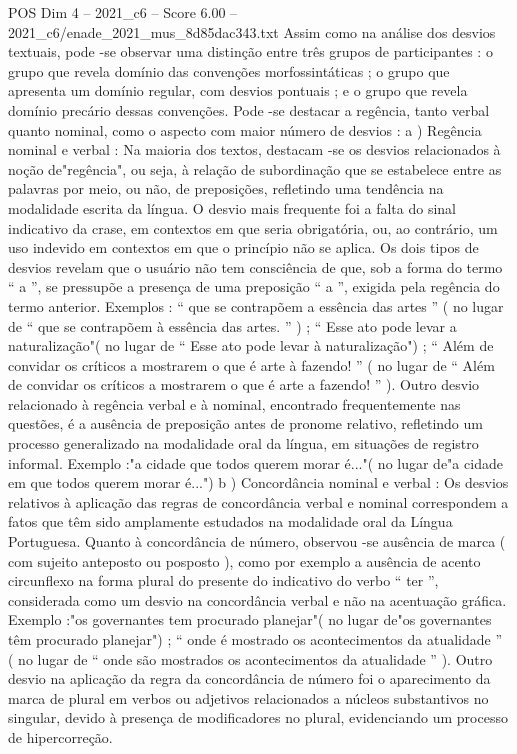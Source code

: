 \begin{textsample}{POS Dim 4 – 2021\_c6 – Score 6.00 – 2021\_c6/enade\_2021\_mus\_8d85dac343.txt}
Assim como na análise dos desvios textuais, pode -se observar uma distinção entre três grupos de participantes : o grupo que revela domínio das convenções morfossintáticas ; o grupo que apresenta um domínio regular, com desvios pontuais ; e o grupo que revela domínio precário dessas convenções.
Pode -se destacar a regência, tanto verbal quanto nominal, como o aspecto com maior número de desvios : a ) Regência nominal e verbal : Na maioria dos textos, destacam -se os desvios relacionados à noção de"regência", ou seja, à relação de subordinação que se estabelece entre as palavras por meio, ou não, de preposições, refletindo uma tendência na modalidade escrita da língua.
O desvio mais frequente foi a falta do sinal indicativo da crase, em contextos em que seria obrigatória, ou, ao contrário, um uso indevido em contextos em que o princípio não se aplica.
Os dois tipos de desvios revelam que o usuário não tem consciência de que, sob a forma do termo “ a ”, se pressupõe a presença de uma preposição “ a ”, exigida pela regência do termo anterior.
Exemplos : “ que se contrapõem a essência das artes ” ( no lugar de “ que se contrapõem à essência das artes. ” ) ; “ Esse ato pode levar a naturalização"( no lugar de “ Esse ato pode levar à naturalização") ; “ Além de convidar os críticos a mostrarem o que é arte à fazendo! ” ( no lugar de “ Além de convidar os críticos a mostrarem o que é arte a fazendo! ” ).
Outro desvio relacionado à regência verbal e à nominal, encontrado frequentemente nas questões, é a ausência de preposição antes de pronome relativo, refletindo um processo generalizado na modalidade oral da língua, em situações de registro informal.
Exemplo :"a cidade que todos querem morar é..."( no lugar de"a cidade em que todos querem morar é...") b ) Concordância nominal e verbal : Os desvios relativos à aplicação das regras de concordância verbal e nominal correspondem a fatos que têm sido amplamente estudados na modalidade oral da Língua Portuguesa.
Quanto à concordância de número, observou -se ausência de marca ( com sujeito anteposto ou posposto ), como por exemplo a ausência de acento circunflexo na forma plural do presente do indicativo do verbo “ ter ”, considerada como um desvio na concordância verbal e não na acentuação gráfica.
Exemplo :"os governantes tem procurado planejar"( no lugar de"os governantes têm procurado planejar") ; “ onde é mostrado os acontecimentos da atualidade ” ( no lugar de “ onde são mostrados os acontecimentos da atualidade ” ).
Outro desvio na aplicação da regra da concordância de número foi o aparecimento da marca de plural em verbos ou adjetivos relacionados a núcleos substantivos no singular, devido à presença de modificadores no plural, evidenciando um processo de hipercorreção.

\end{textsample}
